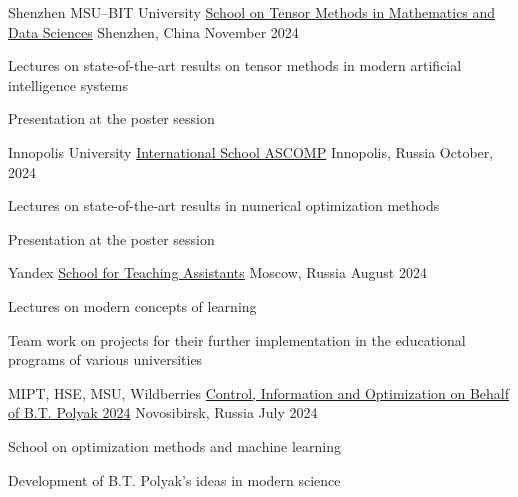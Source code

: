 

\begin{cventries}

\cventry
    {Shenzhen MSU–BIT University} %
    {\href{https://www.inm.ras.ru/school-on-tensor-methods-in-mathematics-and-data-sciences/}{School on Tensor Methods in Mathematics and Data Sciences}} %
    {Shenzhen, China} %
    {November 2024} %
    {
      \begin{cvitems} %
        \item {Lectures on state-of-the-art results on tensor methods in modern artificial intelligence systems}
        \item {Presentation at the poster session}
      \end{cvitems}
    }

\cventry
    {Innopolis University} %
    {\href{http://ascomp.org}{International School ASCOMP}} %
    {Innopolis, Russia} %
    {October, 2024} %
    {
      \begin{cvitems} %
        \item {Lectures on state-of-the-art results in numerical optimization methods}
        \item {Presentation at the poster session}
      \end{cvitems}
    }

\cventry
    {Yandex} %
    {\href{https://education.yandex.ru/teaching-assistants}{School for Teaching Assistants}} %
    {Moscow, Russia} %
    {August 2024} %
    {
      \begin{cvitems} %
        \item {Lectures on modern concepts of learning}
        \item {Team work on projects for their further implementation in the educational programs of various universities}
      \end{cvitems}
    }

\cventry
    {MIPT, HSE, MSU, Wildberries} %
    {\href{http://ssopt.org}{Control, Information and Optimization on Behalf of B.T. Polyak 2024}} %
    {Novosibirsk, Russia} %
    {July 2024} %
    {
      \begin{cvitems} %
        \item {School on optimization methods and machine learning} 
        \item {Development of B.T. Polyak's ideas in modern science}
      \end{cvitems}
    }



\end{cventries}
